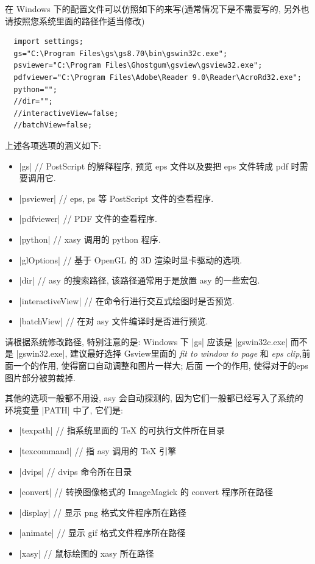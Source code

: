 \documentclass[nofonts,CJKnormalspaces]{ctexbook}[2009/05/20]
\begin{document}
在 Windows 下的配置文件可以仿照如下的来写(通常情况下是不需要写的,
另外也请按照您系统里面的路径作适当修改)

\begin{lstlisting}
  import settings;
  gs="C:\Program Files\gs\gs8.70\bin\gswin32c.exe";
  psviewer="C:\Program Files\Ghostgum\gsview\gsview32.exe";
  pdfviewer="C:\Program Files\Adobe\Reader 9.0\Reader\AcroRd32.exe";
  python="";
  //dir="";
  //interactiveView=false;
  //batchView=false;
\end{lstlisting}

上述各项选项的涵义如下:
\begin{itemize}
\item |gs| // PostScript 的解释程序, 预览 eps 文件以及要把 eps 文件转成 pdf
  时需要调用它.
\item |psviewer| //  eps, ps 等 PostScript 文件的查看程序.
\item |pdfviewer| // PDF 文件的查看程序.
\item |python| // xasy 调用的 python 程序.
\item |glOptions| // 基于 OpenGL 的 3D 渲染时显卡驱动的选项.
\item |dir|    // asy 的搜索路径, 该路径通常用于是放置 asy 的一些宏包.
\item |interactiveView| // 在命令行进行交互式绘图时是否预览.
\item |batchView| // 在对 asy 文件编译时是否进行预览.
\end{itemize}
请根据系统修改路径, 特别注意的是: Windows 下 |gs| 应该是 |gswin32c.exe| 而不是
|gswin32.exe|, 建议最好选择 Gsview里面的 \emph{fit to window to page}
和 \emph{eps clip},前面一个的作用, 使得窗口自动调整和图片一样大; 后面
一个的作用, 使得对于的eps图片部分被剪裁掉.

其他的选项一般都不用设, asy 会自动探测的, 因为它们一般都已经写入了系统的
环境变量 |PATH| 中了, 它们是:
\begin{itemize}
\item |texpath| // 指系统里面的 TeX 的可执行文件所在目录
\item |texcommand| // 指 asy 调用的 TeX 引擎
\item |dvips|  // dvips 命令所在目录
\item |convert| // 转换图像格式的 ImageMagick 的 convert 程序所在路径
\item |display| // 显示 png 格式文件程序所在路径
\item |animate| // 显示 gif 格式文件程序所在路径
\item |xasy| // 鼠标绘图的 xasy 所在路径
\end{itemize}
\end{document}
